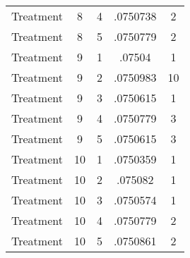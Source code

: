 \begin{tabular}{l*{4}{c}}
Treatment           &           8&           4&    .0750738&           2\\
Treatment           &           8&           5&    .0750779&           2\\
Treatment           &           9&           1&      .07504&           1\\
Treatment           &           9&           2&    .0750983&          10\\
Treatment           &           9&           3&    .0750615&           1\\
Treatment           &           9&           4&    .0750779&           3\\
Treatment           &           9&           5&    .0750615&           3\\
Treatment           &          10&           1&    .0750359&           1\\
Treatment           &          10&           2&     .075082&           1\\
Treatment           &          10&           3&    .0750574&           1\\
Treatment           &          10&           4&    .0750779&           2\\
Treatment           &          10&           5&    .0750861&           2\\
\hline\hline
\end{tabular}
